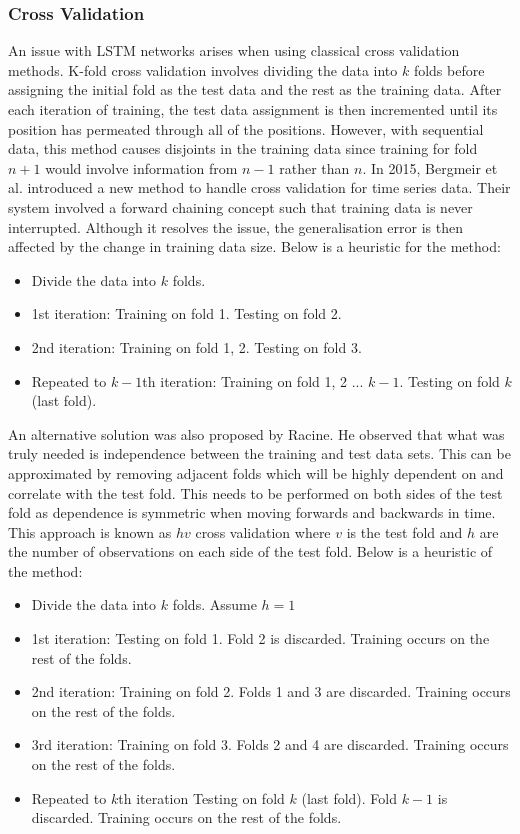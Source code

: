 \documentclass[10pt,onecolumn,letterpaper]{article}
\begin{document}
\subsubsection{Cross Validation} \label{cross validation}

An issue with LSTM networks arises when using classical cross validation methods. K-fold cross validation involves dividing the data into $k$ folds before assigning the initial fold as the test data and the rest as the training data. After each iteration of training, the test data assignment is then incremented until its position has permeated through all of the positions. However, with sequential data, this method causes disjoints in the training data since training for fold $n+1$ would involve information from $n-1$ rather than $n$. In 2015, Bergmeir et al. introduced a new method\cite{Bergmeir} to handle cross validation for time series data. Their system involved a forward chaining concept such that training data is never interrupted. Although it resolves the issue, the generalisation error is then affected by the change in training data size. Below is a heuristic for the method: 

\begin{itemize}
 	\item Divide the data into $k$ folds. 
	\item 1st iteration: Training on fold 1. Testing on fold 2.
	\item 2nd iteration: Training on fold 1, 2. Testing on fold 3. 
	\item Repeated to $k-1$th iteration: Training on fold 1, 2 ... $k-1$. Testing on fold $k$ (last fold). 
\end{itemize}

An alternative solution\cite{Racine} was also proposed by Racine. He observed that what was truly needed is independence between the training and test data sets. This can be approximated by removing adjacent folds which will be highly dependent on and correlate with the test fold. This needs to be performed on both sides of the test fold as dependence is symmetric when moving forwards and backwards in time. This approach is known as $hv$ cross validation where $v$ is the test fold and $h$ are the number of observations on each side of the test fold. Below is a heuristic of the method:

\begin{itemize}
 	\item Divide the data into $k$ folds. Assume $h = 1$ 
	\item 1st iteration: Testing on fold 1. Fold 2 is discarded. Training occurs on the rest of the folds. 
	\item 2nd iteration: Training on fold 2.  Folds 1 and 3 are discarded. Training occurs on the rest of the folds. 
	\item 3rd iteration: Training on fold 3.  Folds 2 and 4 are discarded. Training occurs on the rest of the folds. 
	\item Repeated to $k$th iteration Testing on fold $k$ (last fold). Fold $k-1$ is discarded. Training occurs on the rest of the folds. 
\end{itemize}
\end{document}
